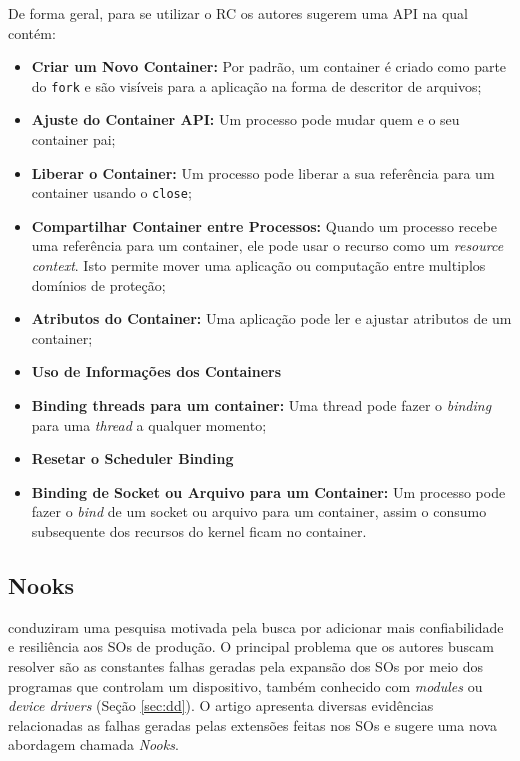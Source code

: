 De forma geral, para se utilizar o RC os autores sugerem uma API na qual
contém:
\begin{itemize}
	\item \textbf{Criar um Novo Container:} Por padrão, um container é criado
				como parte do \texttt{fork} e são visíveis para a aplicação na forma
				de descritor de arquivos;
	\item \textbf{Ajuste do Container API:} Um processo pode mudar quem e o seu
				container pai;
	\item \textbf{Liberar o Container:} Um processo pode liberar a sua referência
				para um container usando o \texttt{close};
	\item \textbf{Compartilhar Container entre Processos:} Quando um processo
				recebe uma referência para um container, ele pode usar o recurso como
				um \emph{resource context}. Isto permite mover uma aplicação ou
				computação entre multiplos domínios de proteção;
	\item \textbf{Atributos do Container:} Uma aplicação pode ler e ajustar
				atributos de um container;
	\item \textbf{Uso de Informações dos Containers}
	\item \textbf{Binding threads para um container:} Uma thread pode fazer o
				\emph{binding} para uma \emph{thread} a qualquer momento;
	\item \textbf{Resetar o Scheduler Binding}
	\item \textbf{Binding de Socket ou Arquivo para um Container:} Um processo
				pode fazer o \emph{bind} de um socket ou arquivo para um container,
				assim o consumo subsequente dos recursos do kernel ficam no container.
\end{itemize}

\subsection{Nooks}
\cite{nooks} conduziram uma pesquisa motivada pela busca por
adicionar mais confiabilidade e resiliência aos SOs de produção. O principal
problema que os autores buscam resolver são as constantes falhas geradas pela
expansão dos SOs por meio dos programas que controlam um dispositivo, também
conhecido com \emph{modules} ou \emph{device drivers} (Seção \ref{sec:dd}). O
artigo apresenta diversas evidências relacionadas as falhas geradas
pelas extensões feitas nos SOs e sugere uma nova abordagem chamada
\emph{Nooks}.

